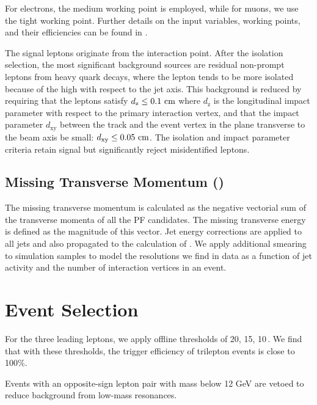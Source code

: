 For electrons, the medium working point is employed, while for muons, we use the tight working point. Further details on the input variables, working points, and their efficiencies can be found in \cite{CMS-PAS-SUS-15-008}.

The signal leptons originate from the interaction point. After the isolation selection, the most significant background sources are residual non-prompt leptons from heavy quark decays, where the lepton tends to be more isolated because of the high \pt with respect to the jet axis. This background is reduced by requiring that the leptons satisfy $d_\textrm{z} \leq 0.1\,\,\text{cm}$ where $d_\textrm{z}$ is the longitudinal impact parameter with respect to the primary interaction vertex, and that the impact parameter $d_\textrm{xy}$ between the track and the event vertex in the plane transverse to the beam axis be small: $d_\textrm{xy} \leq 0.05\,\,\text{cm}$. The isolation and impact parameter criteria retain signal but significantly reject misidentified leptons.

\subsection{Missing Transverse Momentum (\MET)}
The missing transverse momentum is calculated as the negative vectorial sum of the transverse momenta of all the PF candidates. The missing transverse energy \MET is defined as the magnitude of this vector. Jet energy corrections are applied to all jets and also propagated to the calculation of \MET \cite{CMS-PAS-JME-12-002}. We apply additional smearing to simulation samples to model the \MET resolutions we find in data as a function of jet activity and the number of interaction vertices in an event.


\section{Event Selection}
\label{sec:Selection}

For the three leading leptons, we apply offline thresholds of 20, 15, 10\,\GeV. We find that with these thresholds, the trigger efficiency of trilepton events is close to 100\%.

Events with an opposite-sign lepton pair with mass below 12 GeV are vetoed to reduce background from low-mass resonances.
